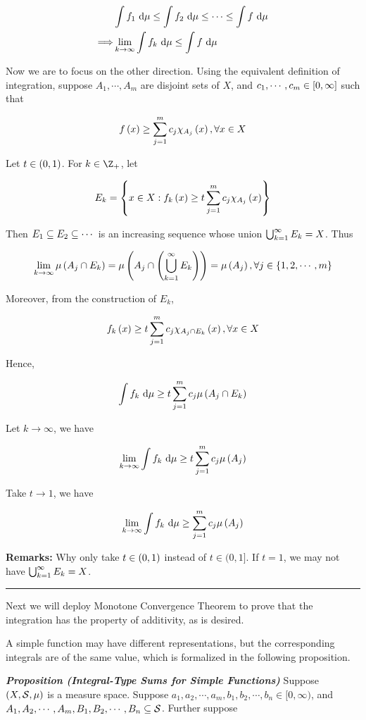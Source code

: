 \documentclass[
]{article}
\begin{document}
\[\begin{aligned}
& \int f_1\text{ d}\mu \le \int f_2\text{ d}\mu \le \cdots \le \int f\text{ d}\mu\\
\Longrightarrow & \lim_{k\to \infty}\int f_k\text{ d}\mu \le \int f\text{ d}\mu
\end{aligned}\]

Now we are to focus on the other direction. Using the equivalent
definition of integration, suppose \(A_1,\cdots ,A_m\) are disjoint sets
of \(X\), and \(c_1,\cdots ,c_m\in \left[0,\infty\right]\) such that

\[f\left(x\right)\ge \sum_{j = 1}^mc_j\chi_{A_j}\left(x\right),\forall x\in X\]

Let \(t\in \left(0,1\right)\). For \(k\in \Z_+\), let

\[E_k = \left\{x\in X: f_k\left(x\right)\ge t \sum_{j = 1}^m c_j\chi_{A_j}\left(x\right)\right\}\]

Then \(E_1\subseteq E_2\subseteq \cdots\) is an increasing sequence whose union
\(\bigcup_{{k} = 1}^{\infty} E_k = X\). Thus

\[\lim_{k\to\infty}\mu\left(A_j\cap E_k\right) = \mu\left(A_j\cap \left(\bigcup_{{k} = 1}^{\infty} E_k\right)\right) = \mu\left(A_j\right),\forall j\in \left\{1,2,\cdots,m\right\}\]

Moreover, from the construction of \(E_k\),

\[f_k\left(x\right)\ge t\sum_{j = 1}^m c_j\chi_{A_j\cap E_k}\left(x\right),\forall x\in X\]

Hence,

\[\int f_k\text{ d}\mu \ge t\sum_{j = 1}^mc_j\mu\left(A_j\cap E_k\right)\]

Let \(k\to \infty\), we have

\[\lim_{k \to \infty}\int f_k\text{ d}\mu \ge t\sum_{j = 1}^mc_j\mu\left(A_j\right)\]

Take \(t\to 1\), we have

\[\lim_{k \to \infty}\int f_k\text{ d}\mu \ge \sum_{j = 1}^mc_j\mu\left(A_j\right)\]

\textbf{Remarks:} Why only take \(t\in \left(0,1\right)\) instead of
\(t\in (0,1]\). If \(t = 1\), we may not have \(\bigcup_{{k} = 1}^{\infty} E_k = X\).

\begin{center}\rule{0.5\linewidth}{0.5pt}\end{center}

Next we will deploy Monotone Convergence Theorem to prove that the
integration has the property of additivity, as is desired.

A simple function may have different representations, but the
corresponding integrals are of the same value, which is formalized in
the following proposition.

\emph{\textbf{Proposition (Integral-Type Sums for Simple Functions)}}
Suppose \(\left(X,\mathcal S,\mu\right)\) is a measure space. Suppose
\(a_1,a_2,\cdots,a_m,b_1,b_2,\cdots ,b_n\in [0,\infty)\), and
\(A_1,A_2,\cdots,A_m,B_1,B_2,\cdots ,B_n\subseteq\mathcal S\). Further suppose
\end{document}
